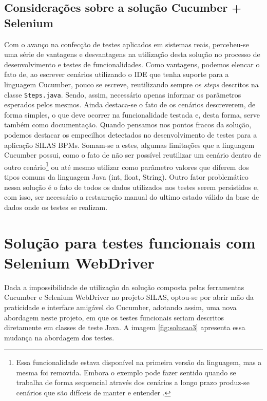 \documentclass[tg]{mdtufsm}
\begin{document}
\subsection{Considerações sobre a solução Cucumber + Selenium}
Com o avanço na confecção de testes aplicados em sistemas reais, percebeu-se uma série de vantagens e desvantagens na utilização desta solução no processo de desenvolvimento e testes de funcionalidades.
Como vantagens, podemos elencar o fato de, ao escrever cenários utilizando o IDE que tenha suporte para a linguagem Cucumber, pouco se escreve, reutilizando sempre os \emph{steps} descritos na classe \texttt{Steps.java}. Sendo, assim, necessário apenas informar os parâmetros esperados pelos mesmos. Ainda destaca-se o fato de os cenários descreverem, de forma simples, o que deve ocorrer na funcionalidade testada e, desta forma, serve também como documentação.
Quando pensamos nos pontos fracos da solução, podemos destacar os empecilhos detectados no desenvolvimento de testes para a aplicação SILAS BPMs. Somam-se a estes, algumas limitações que a linguagem Cucumber possui, como o fato de não ser possível reutilizar um cenário dentro de outro cenário\footnote{Essa funcionalidade estava disponível na primeira versão da linguagem, mas a mesma foi removida. Embora o exemplo pode fazer sentido quando se trabalha de forma sequencial através dos cenários a longo prazo produz-se cenários que são difíceis de manter e entender \cite{givenscenario}. } ou até mesmo utilizar como parâmetro valores que diferem dos tipos comuns da linguagem Java (int, float, String). Outro fator problemático nessa solução é o fato de todos os dados utilizados nos testes serem persistidos e, com isso, ser necessário a restauração manual do ultimo estado válido da base de dados onde os testes se realizam.

\section{Solução para testes funcionais com Selenium WebDriver}
Dada a impossibilidade de utilização da solução composta pelas ferramentas Cucumber e Selenium WebDriver no projeto SILAS, optou-se por abrir mão da praticidade e interface amigável do Cucumber, adotando assim, uma nova abordagem neste projeto, em que os testes funcionais seriam descritos diretamente em classes de teste Java. A imagem \ref{fig:solucao3} apresenta essa mudança na abordagem dos testes.
\end{document}
